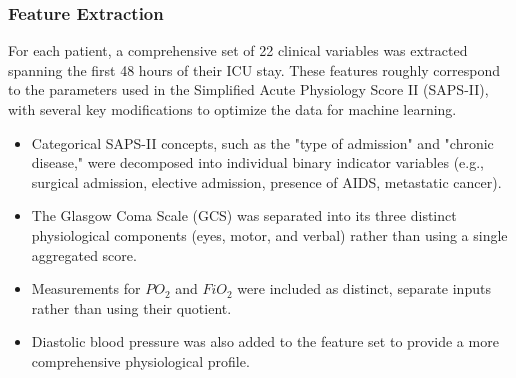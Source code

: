 \subsubsection{Feature Extraction}
For each patient, a comprehensive set of 22 clinical variables was extracted spanning the first 48 hours of their ICU stay. These features roughly correspond to the parameters used in the Simplified Acute Physiology Score II (SAPS-II), with several key modifications to optimize the data for machine learning.
\begin{itemize}
    \item Categorical SAPS-II concepts, such as the "type of admission" and "chronic disease," were decomposed into individual binary indicator variables (e.g., surgical admission, elective admission, presence of AIDS, metastatic cancer).
    \item The Glasgow Coma Scale (GCS) was separated into its three distinct physiological components (eyes, motor, and verbal) rather than using a single aggregated score.
    \item Measurements for $PO_{2}$ and $FiO_{2}$ were included as distinct, separate inputs rather than using their quotient.
    \item Diastolic blood pressure was also added to the feature set to provide a more comprehensive physiological profile.
\end{itemize}

